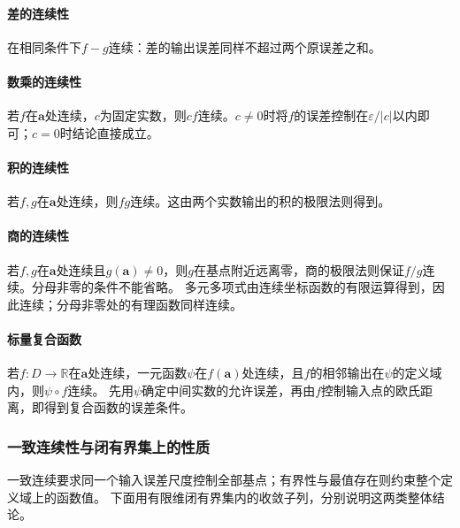\paragraph{差的连续性}
在相同条件下$f-g$连续：差的输出误差同样不超过两个原误差之和。

\paragraph{数乘的连续性}
若$f$在$\bm a$处连续，$c$为固定实数，则$cf$连续。$c\neq0$时将$f$的误差控制在$\varepsilon/|c|$以内即可；$c=0$时结论直接成立。

\paragraph{积的连续性}
若$f,g$在$\bm a$处连续，则$fg$连续。这由两个实数输出的积的极限法则得到。

\paragraph{商的连续性}
若$f,g$在$\bm a$处连续且$g(\bm a)\neq0$，则$g$在基点附近远离零，商的极限法则保证$f/g$连续。分母非零的条件不能省略。
多元多项式由连续坐标函数的有限运算得到，因此连续；分母非零处的有理函数同样连续。

\paragraph{标量复合函数}
若$f:D\to\mathbb R$在$\bm a$处连续，一元函数$\psi$在$f(\bm a)$处连续，且$f$的相邻输出在$\psi$的定义域内，则$\psi\circ f$连续。
先用$\psi$确定中间实数的允许误差，再由$f$控制输入点的欧氏距离，即得到复合函数的误差条件。

\subsubsection{一致连续性与闭有界集上的性质}

一致连续要求同一个输入误差尺度控制全部基点；有界性与最值存在则约束整个定义域上的函数值。
下面用有限维闭有界集内的收敛子列，分别说明这两类整体结论。

